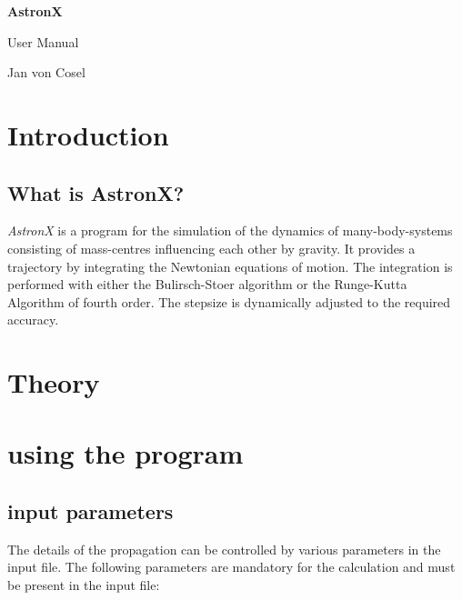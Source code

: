 \documentclass[a4paper,twoside,12pt]{book}
\begin{document}
\begin{titlepage}
\begin{center}


{\huge \bfseries AstronX}


{\LARGE User Manual}


Jan von Cosel


\end{center}
\end{titlepage}

\tableofcontents

\chapter{Introduction}

\section{What is AstronX?}

\textit{AstronX} is a program for the simulation of the dynamics of many-body-systems consisting of mass-centres influencing each other by gravity. It provides a trajectory by integrating the Newtonian equations of motion. The integration is performed with either the Bulirsch-Stoer algorithm or the Runge-Kutta Algorithm of fourth order. The stepsize is dynamically adjusted to the required accuracy.

\chapter{Theory}

\chapter{using the program}

\section{input parameters}

The details of the propagation can be controlled by various parameters in the input file. The following parameters are mandatory for the calculation and must be present in the input file:
\end{document}
